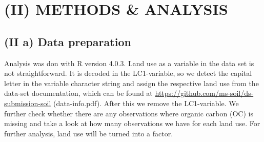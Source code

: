 \documentclass[
]{article}
\begin{document}
\hypertarget{ii-methods-analysis}{%
\section{(II) METHODS \& ANALYSIS}\label{ii-methods-analysis}}

\hypertarget{ii-a-data-preparation}{%
\subsection{(II a) Data preparation}\label{ii-a-data-preparation}}

Analysis was don with R version 4.0.3. Land use as a variable in the
data set is not straightforward. It is decoded in the LC1-variable, so
we detect the capital letter in the variable character string and assign
the respective land use from the data-set documentation, which can be
found at \url{https://github.com/ms-soil/ds-submission-soil}
(data-info.pdf). After this we remove the LC1-variable. We further check
whether there are any observations where organic carbon (OC) is missing
and take a look at how many observations we have for each land use. For
further analysis, land use will be turned into a factor.
\end{document}
